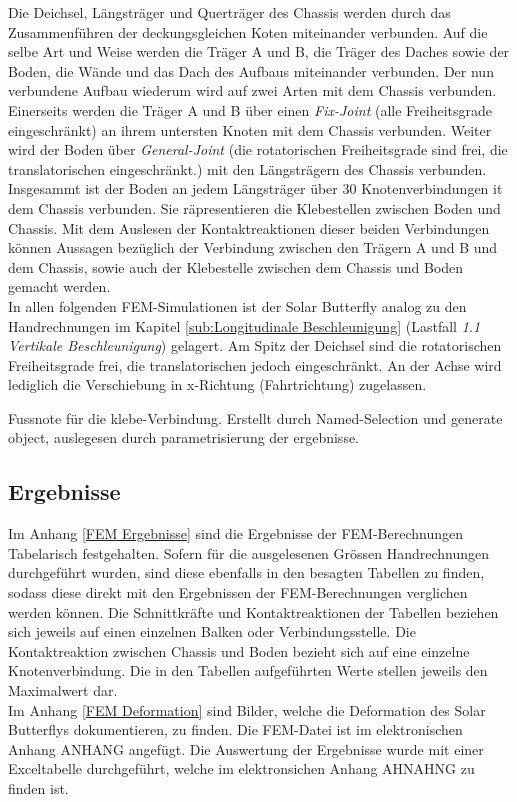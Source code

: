 Die Deichsel, Längsträger und Querträger des Chassis werden durch das Zusammenführen der deckungsgleichen Koten miteinander verbunden. Auf die selbe Art und Weise werden die Träger A und B, die Träger des Daches sowie der Boden, die Wände und das Dach des Aufbaus miteinander verbunden. Der nun verbundene Aufbau wiederum wird auf zwei Arten mit dem Chassis verbunden. Einerseits werden die Träger A und B über einen \emph{Fix-Joint} (alle Freiheitsgrade eingeschränkt) an ihrem untersten Knoten mit dem Chassis verbunden. Weiter wird der Boden über \emph{General-Joint} (die rotatorischen Freiheitsgrade sind frei, die translatorischen eingeschränkt.) mit den Längsträgern des Chassis verbunden. Insgesammt ist der Boden an jedem Längsträger über 30 Knotenverbindungen it dem Chassis verbunden. Sie räpresentieren die Klebestellen zwischen Boden und Chassis. Mit dem Auslesen der Kontaktreaktionen dieser beiden Verbindungen können Aussagen bezüglich der Verbindung zwischen den Trägern A und B und dem Chassis, sowie auch der Klebestelle zwischen dem Chassis und Boden gemacht werden.\\
In allen folgenden FEM-Simulationen ist der Solar Butterfly analog zu den Handrechnungen im Kapitel \ref{sub:Longitudinale Beschleunigung} (Lastfall \emph{1.1 Vertikale Beschleunigung}) gelagert. Am Spitz der Deichsel sind die rotatorischen Freiheitsgrade frei, die translatorischen jedoch eingeschränkt. An der Achse wird lediglich die Verschiebung in x-Richtung (Fahrtrichtung) zugelassen.

Fussnote für die klebe-Verbindung. Erstellt durch Named-Selection und generate object, auslegesen durch parametrisierung der ergebnisse.

\subsection{Ergebnisse}
Im Anhang \ref{FEM Ergebnisse} sind die Ergebnisse der FEM-Berechnungen Tabelarisch festgehalten. Sofern für die ausgelesenen Grössen Handrechnungen durchgeführt wurden, sind diese ebenfalls in den besagten Tabellen zu finden, sodass diese direkt mit den Ergebnissen der FEM-Berechnungen verglichen werden können. Die Schnittkräfte und Kontaktreaktionen der Tabellen beziehen sich jeweils auf einen einzelnen Balken oder Verbindungsstelle. Die Kontaktreaktion zwischen Chassis und Boden bezieht sich auf eine einzelne Knotenverbindung. Die in den Tabellen aufgeführten Werte stellen jeweils den Maximalwert dar.\\
Im Anhang \ref{FEM Deformation} sind Bilder, welche die Deformation des Solar Butterflys dokumentieren, zu finden. Die FEM-Datei ist im elektronischen Anhang ANHANG angefügt. Die Auswertung der Ergebnisse wurde mit einer Exceltabelle durchgeführt, welche im elektronsichen Anhang AHNAHNG zu finden ist.


